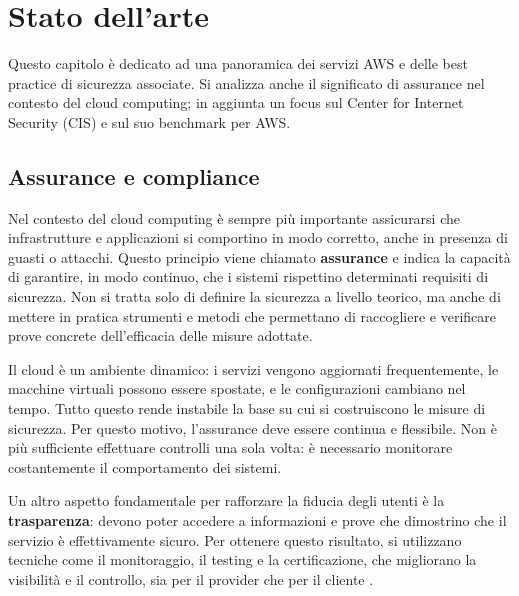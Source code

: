 \chapter{Stato dell'arte}
\label{cap:stato_arte}

Questo capitolo è dedicato ad una panoramica dei servizi AWS e delle best practice di sicurezza associate. Si analizza anche il significato di assurance nel contesto del cloud computing; in aggiunta un focus sul Center for Internet Security (CIS) e sul suo benchmark per AWS.

\section{Assurance e compliance}
\label{sec:assurance}

Nel contesto del cloud computing è sempre più importante assicurarsi che infrastrutture e applicazioni si comportino in modo corretto, anche in presenza di guasti o attacchi. Questo principio viene chiamato \textbf{assurance} e indica la capacità di garantire, in modo continuo, che i sistemi rispettino determinati requisiti di sicurezza. Non si tratta solo di definire la sicurezza a livello teorico, ma anche di mettere in pratica strumenti e metodi che permettano di raccogliere e verificare prove concrete dell'efficacia delle misure adottate.

Il cloud è un ambiente dinamico: i servizi vengono aggiornati frequentemente, le macchine virtuali possono essere spostate, e le configurazioni cambiano nel tempo. Tutto questo rende instabile la base su cui si costruiscono le misure di sicurezza. Per questo motivo, l'assurance deve essere continua e flessibile. Non è più sufficiente effettuare controlli una sola volta: è necessario monitorare costantemente il comportamento dei sistemi.

Un altro aspetto fondamentale per rafforzare la fiducia degli utenti è la \textbf{trasparenza}: devono poter accedere a informazioni e prove che dimostrino che il servizio è effettivamente sicuro. Per ottenere questo risultato, si utilizzano tecniche come il monitoraggio, il testing e la certificazione, che migliorano la visibilità e il controllo, sia per il provider che per il cliente \cite{ardagna2015security}.

